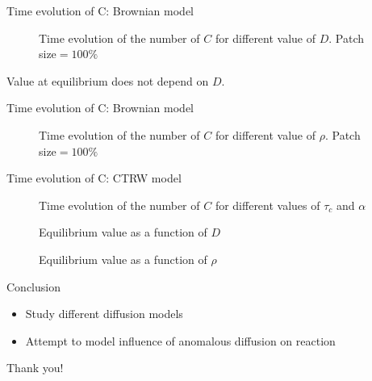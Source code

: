 \documentclass{beamer}
\begin{document}
\begin{frame}{Time evolution of C: Brownian model}

\begin{figure}
\caption{Time evolution of the number of $C$ for different value of $D$. Patch size$=100\%$}
\end{figure}
Value at equilibrium does not depend on $D$.
\end{frame}

\begin{frame}
{Time evolution of C: Brownian model}
\begin{figure}
\caption{Time evolution of the number of $C$ for different value of $\rho$. Patch size$=100\%$}
\end{figure}
\end{frame}


\begin{frame}{Time evolution of C: CTRW model}

\begin{figure}
\caption{Time evolution of the number of $C$ for different values of $\tau_c$ and $\alpha$}
\end{figure}
\end{frame}

\begin{frame}
\begin{figure}
\caption{Equilibrium value as a function of $D$}
\end{figure}
\end{frame}



\begin{frame}
\begin{figure}
\caption{Equilibrium value as a function of $\rho$}
\end{figure}
\end{frame}

\begin{frame}
\end{frame}

\begin{frame}{Conclusion}

\begin{itemize}
\itemsep2em
\item Study different diffusion models
\item Attempt to model influence of anomalous diffusion on reaction
\end{itemize}

\end{frame}

\begin{frame}
\begin{center}
\Huge \color{blue} Thank you!
\end{center}
\end{frame}
\end{document}
